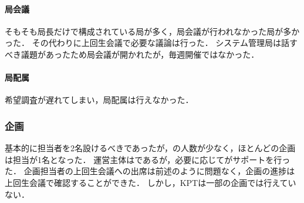 \paragraph*{局会議}
そもそも局長だけで構成されている局が多く，局会議が行われなかった局が多かった．
その代わりに上回生会議で必要な議論は行った．
システム管理局は話すべき議題があったため局会議が開かれたが，毎週開催ではなかった．
\paragraph*{局配属}
希望調査が遅れてしまい，局配属は行えなかった．

\subsubsection*{企画}
基本的に担当者を2名設けるべきであったが，\secondGrade{}の人数が少なく，ほとんどの企画は担当が1名となった．
運営主体は\secondGrade{}であるが，必要に応じて\thirdGrade{}がサポートを行った．
企画担当者の上回生会議への出席は前述のように問題なく，企画の進捗は上回生会議で確認することができた．
しかし，KPTは一部の企画では行えていない．
